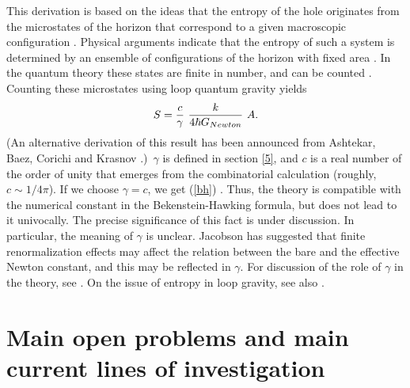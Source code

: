 \documentclass[12pt]{article}
\begin{document}
\begin{itemize}
This derivation is based on the ideas that the entropy of the 
hole originates from the microstates of the horizon that 
correspond to a given macroscopic configuration 
\cite{York,Carlip95,Carlip97,Bala2,Bala}.  Physical arguments 
indicate that the entropy of such a system is determined by an 
ensemble of configurations of the horizon with fixed area 
\cite{Rovelli96}.  In the quantum theory these states are finite 
in number, and can be counted \cite{Krasnov,Krasnov2}.  Counting 
these microstates using loop quantum gravity yields
\begin{equation}
    S = \frac{c}{\gamma}\ {k\over 4 \hbar G_{Newton}} \ A.
\end{equation}
(An alternative derivation of this result has been announced from 
Ashtekar, Baez, Corichi and Krasnov \cite{AshtekarEtAl97}.)\ 
$\gamma$ is defined in section \ref{5}, and $c$ is a real number 
of the order of unity that emerges from the combinatorial 
calculation (roughly, $c \sim 1/4\pi$).  If we choose $\gamma=c$, 
we get (\ref{bh}) \cite{RovelliThiemann,CorichiKrasnov}.  Thus, 
the theory is compatible with the numerical constant in the 
Bekenstein-Hawking formula, but does not lead to it univocally.  
The precise significance of this fact is under discussion.  In 
particular, the meaning of $\gamma$ is unclear.  Jacobson has 
suggested \cite{Jacobson} that finite renormalization effects may 
affect the relation between the bare and the effective Newton 
constant, and this may be reflected in $\gamma$.  For discussion 
of the role of $\gamma$ in the theory, see 
\cite{RovelliThiemann}.  On the issue of entropy in loop gravity, 
see also \cite{Smolin95}.

\end{itemize}
  
\section{Main open problems and main current lines of 
investigation}\label{7}
\end{document}
